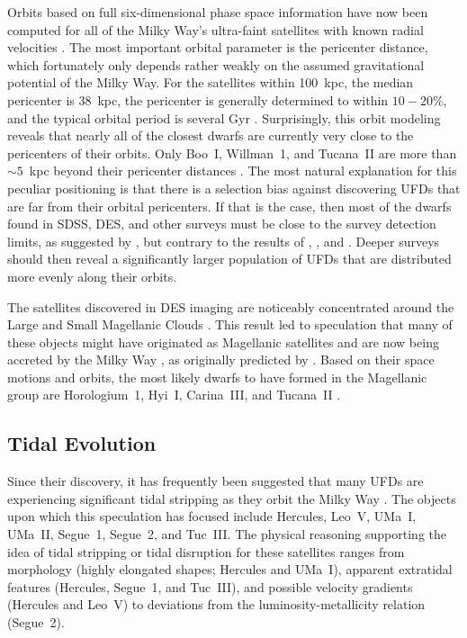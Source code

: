 \documentclass[a4paper]{ar-1col}
\begin{document}
Orbits based on full six-dimensional phase space information have now
been computed for all of the Milky Way's ultra-faint satellites with
known radial velocities
\citep{gaiadr2helmi,simon18,fritz18b,kallivayalil18}.  The most
important orbital parameter is the pericenter distance, which
fortunately only depends rather weakly on the assumed gravitational
potential of the Milky Way.  For the satellites within 100~kpc, the
median pericenter is 38~kpc, the pericenter is generally determined to
within $10-20$\%, and the typical orbital period is several Gyr
\citep{simon18,fritz18}.  Surprisingly, this orbit modeling reveals
that nearly all of the closest dwarfs are currently very close to the
pericenters of their orbits.  Only Boo~I, Willman~1, and Tucana~II are
more than $\sim5$~kpc beyond their pericenter distances
\citep{simon18}.  The most natural explanation for this peculiar
positioning is that there is a selection bias against discovering UFDs
that are far from their orbital pericenters.  If that is the case,
then most of the dwarfs found in SDSS, DES, and other surveys must be
close to the survey detection limits, as suggested by
\citet{koposov08}, but contrary to the results of \citet{walsh09},
\citet{bechtol15}, and \citet{drlica15}.  Deeper surveys should then
reveal a significantly larger population of UFDs that are distributed
more evenly along their orbits.

The satellites discovered in DES imaging are noticeably concentrated
around the Large and Small Magellanic Clouds
\citep{bechtol15,drlica15}.  This result led to speculation that many
of these objects might have originated as Magellanic satellites and
are now being accreted by the Milky Way
\citep{deason15,drlica15,jethwa16,sales17}, as originally predicted by
\citet{dl08}.  Based on their space motions and orbits, the most
likely dwarfs to have formed in the Magellanic group are Horologium~1,
Hyi~I, Carina~III, and Tucana~II \citep{kallivayalil18,simon18}.


\subsection{Tidal Evolution}

Since their discovery, it has frequently been suggested that many UFDs
are experiencing significant tidal stripping as they orbit the Milky
Way
\citep[e.g.,][]{belokurov06,zucker06b,no09,munoz10,sand12,kirby13,roderick15,collins17,simon17}.
The objects upon which this speculation has focused include Hercules,
Leo~V, UMa~I, UMa~II, Segue~1, Segue~2, and Tuc~III.  The physical
reasoning supporting the idea of tidal stripping or tidal disruption
for these satellites ranges from morphology (highly elongated shapes;
Hercules and UMa~I), apparent extratidal features (Hercules, Segue~1,
and Tuc~III), and possible velocity gradients (Hercules and Leo~V) to
deviations from the luminosity-metallicity relation (Segue~2).
\end{document}
